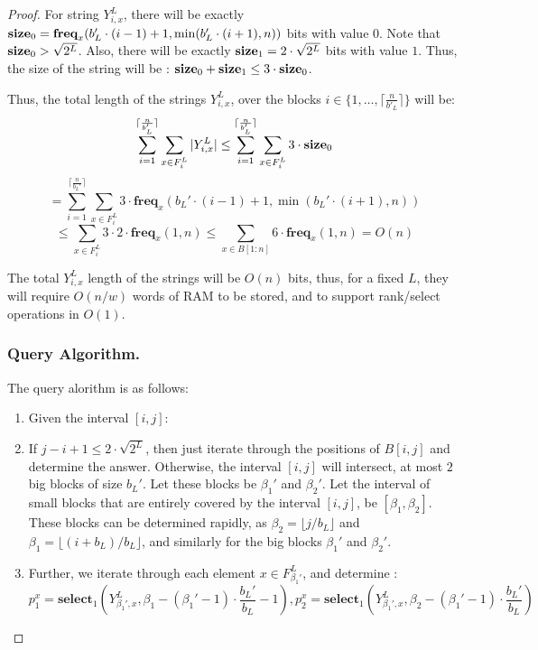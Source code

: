 \documentclass[runningheads]{llncs}
\begin{document}
\begin{proof}
    For string $Y_{i,x}^L$, there will be exactly $\text{\textbf{size}}_0=\textbf{freq}_x(b_L'\cdot(i-1)+1, \min( b_L'\cdot (i+1), n) )$ bits with value $0$. 
    Note that $\text{\textbf{size}}_0>\sqrt{2^L}$.
    Also, there will be exactly $\text{\textbf{size}}_1=2\cdot \sqrt{2^L}$ bits with value $1$. Thus, the size of the string will be : $\text{\textbf{size}}_0+\text{\textbf{size}}_1 \leq 3 \cdot \text{\textbf{size}}_0$. 

    Thus, the total length of the strings $Y_{i,x}^L$, over the blocks $i\in \{1,\dots, \lceil \frac{n}{b'_L} \rceil\}$ will be:
    \[
        \sum_{i=1}^{\lceil \frac{n}{b_L'} \rceil } \sum_{x\in F_{i}^L } |Y_{i,x}^L| \leq \sum_{i=1}^{\lceil \frac{n}{b_L'} \rceil } \sum_{x\in F_{i}^L } 3 \cdot \text{\textbf{size}}_0
    \]
    \[
        = \sum_{i=1}^{\lceil \frac{n}{b_L'} \rceil } \sum_{x\in F_{i}^L } 3\cdot \textbf{freq}_x(b_L'\cdot(i-1)+1, \min( b_L'\cdot (i+1), n) )
    \]
    \[
        \leq \sum_{x\in F_{i}^L } 3\cdot 2 \cdot \textbf{freq}_x(1,n) \leq \sum_{x \in B[1:n]} 6 \cdot \textbf{freq}_x(1,n) = O(n)
    \]

    The total $Y_{i,x}^L$ length of the strings will be $O(n)$ bits, thus, for a fixed $L$, they will require $O(n/w)$ words of RAM to be stored, 
    and to support rank/select operations in $O(1)$.


    \subsubsection{Query Algorithm.} The query alorithm is as follows:

        \begin{enumerate}
            \item[] Given the interval $[i,j]$:
            
            \item If $j-i+1\leq 2\cdot \sqrt{2^L}$, then just iterate through the positions of $B[i,j]$ and determine the answer. 
            Otherwise, the interval $[i,j]$ will intersect, at most $2$ big blocks of size $b_L'$. Let these blocks be $\beta_1'$ and $\beta_2'$. 
            Let the interval of small blocks that are entirely covered by the interval $[i,j]$, be $[\beta_1, \beta_2]$. 
            These blocks can be determined rapidly, as $\beta_2=\lfloor j/b_L \rfloor$ and $\beta_1=\lfloor (i+b_L)/b_L \rfloor$, and similarly 
            for the big blocks $\beta_1'$ and $\beta_2'$.
            
            \item Further, we iterate through each element $x\in F_{\beta_1'}^L$, and determine :
            \[
                p_1^x = \textbf{select}_1( Y_{\beta_1',x}^L, \beta_1-(\beta_1'-1)\cdot \frac{b_L'}{b_L}-1 ) , 
                p_2^x = \textbf{select}_1( Y_{\beta_1',x}^L, \beta_2-(\beta_1'-1)\cdot \frac{b_L'}{b_L} ) 
            \]


\end{enumerate}
\end{proof}
\end{document}
